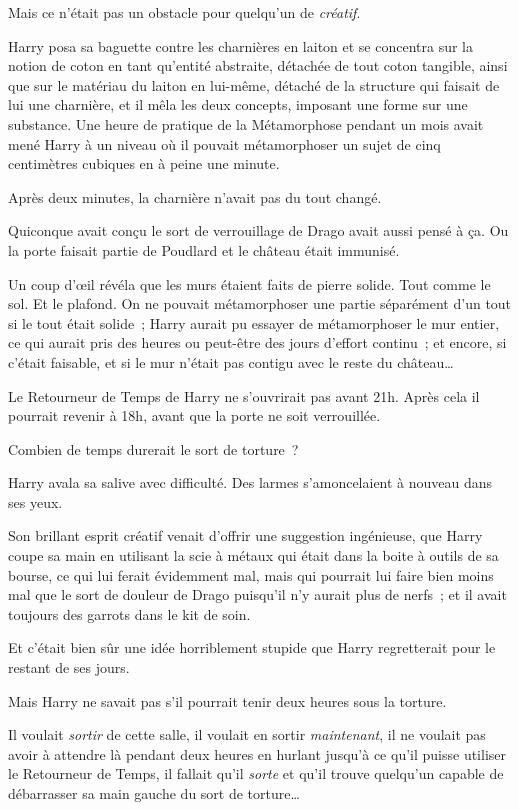 Mais ce n'était pas un obstacle pour quelqu'un de \emph{créatif}.

Harry posa sa baguette contre les charnières en laiton et se concentra sur la notion de coton en tant qu'entité abstraite, détachée de tout coton tangible, ainsi que sur le matériau du laiton en lui-même, détaché de la structure qui faisait de lui une charnière, et il mêla les deux concepts, imposant une forme sur une substance. Une heure de pratique de la Métamorphose pendant un mois avait mené Harry à un niveau où il pouvait métamorphoser un sujet de cinq centimètres cubiques en à peine une minute.

Après deux minutes, la charnière n'avait pas du tout changé.

Quiconque avait conçu le sort de verrouillage de Drago avait aussi pensé à ça. Ou la porte faisait partie de Poudlard et le château était immunisé.

Un coup d'œil révéla que les murs étaient faits de pierre solide. Tout comme le sol. Et le plafond. On ne pouvait métamorphoser une partie séparément d'un tout si le tout était solide~; Harry aurait pu essayer de métamorphoser le mur entier, ce qui aurait pris des heures ou peut-être des jours d'effort continu~; et encore, si c'était faisable, et si le mur n'était pas contigu avec le reste du château…

Le Retourneur de Temps de Harry ne s'ouvrirait pas avant 21h. Après cela il pourrait revenir à 18h, avant que la porte ne soit verrouillée.

Combien de temps durerait le sort de torture~?

Harry avala sa salive avec difficulté. Des larmes s'amoncelaient à nouveau dans ses yeux.

Son brillant esprit créatif venait d'offrir une suggestion ingénieuse, que Harry coupe sa main en utilisant la scie à métaux qui était dans la boite à outils de sa bourse, ce qui lui ferait évidemment mal, mais qui pourrait lui faire bien moins mal que le sort de douleur de Drago puisqu'il n'y aurait plus de nerfs~; et il avait toujours des garrots dans le kit de soin.

Et c'était bien sûr une idée horriblement stupide que Harry regretterait pour le restant de ses jours.

Mais Harry ne savait pas s'il pourrait tenir deux heures sous la torture.

Il voulait \emph{sortir} de cette salle, il voulait en sortir \emph{maintenant}, il ne voulait pas avoir à attendre là pendant deux heures en hurlant jusqu'à ce qu'il puisse utiliser le Retourneur de Temps, il fallait qu'il \emph{sorte} et qu'il trouve quelqu'un capable de débarrasser sa main gauche du sort de torture…

